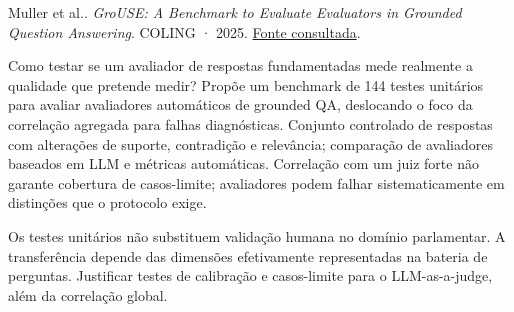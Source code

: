{\small Muller et al.. \textit{GroUSE: A Benchmark to Evaluate Evaluators in Grounded Question Answering}. COLING · 2025. \href{https://aclanthology.org/2025.coling-main.304/}{Fonte consultada}.\par}
Como testar se um avaliador de respostas fundamentadas mede realmente a qualidade que pretende medir?
Propõe um benchmark de 144 testes unitários para avaliar avaliadores automáticos de grounded QA, deslocando o foco da correlação agregada para falhas diagnósticas.
Conjunto controlado de respostas com alterações de suporte, contradição e relevância; comparação de avaliadores baseados em LLM e métricas automáticas.
Correlação com um juiz forte não garante cobertura de casos-limite; avaliadores podem falhar sistematicamente em distinções que o protocolo exige.
\begin{itemize}
\end{itemize}
Os testes unitários não substituem validação humana no domínio parlamentar. A transferência depende das dimensões efetivamente representadas na bateria de perguntas.
Justificar testes de calibração e casos-limite para o LLM-as-a-judge, além da correlação global.
\clearpage

